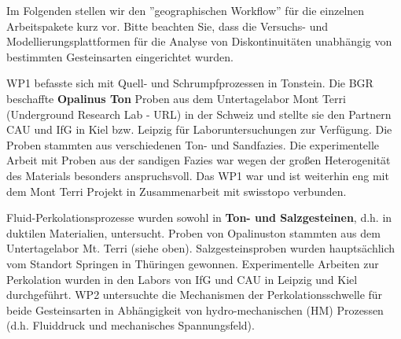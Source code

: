 Im Folgenden stellen wir den ''geographischen Workflow'' für die einzelnen Arbeitspakete kurz vor. Bitte beachten Sie, dass die Versuchs- und Modellierungsplattformen für die Analyse von Diskontinuitäten unabhängig von bestimmten Gesteinsarten eingerichtet wurden.

WP1 befasste sich mit Quell- und Schrumpfprozessen in Tonstein. Die BGR beschaffte \textbf{Opalinus Ton} Proben aus dem Untertagelabor Mont Terri (Underground Research Lab - URL) in der Schweiz und stellte sie den Partnern CAU und IfG in Kiel bzw. Leipzig für Laboruntersuchungen zur Verfügung. Die Proben stammten aus verschiedenen Ton- und Sandfazies. Die experimentelle Arbeit mit Proben aus der sandigen Fazies war wegen der gro{\ss}en Heterogenität des Materials besonders anspruchsvoll. Das WP1 war und ist weiterhin eng mit dem Mont Terri Projekt in Zusammenarbeit mit swisstopo verbunden.

Fluid-Perkolationsprozesse wurden sowohl in \textbf{Ton- und Salzgesteinen}, d.h. in duktilen Materialien, untersucht. Proben von Opalinuston stammten aus dem Untertagelabor Mt. Terri (siehe oben). Salzgesteinsproben wurden hauptsächlich vom Standort Springen in Thüringen gewonnen. Experimentelle Arbeiten zur Perkolation wurden in den Labors von IfG und CAU in Leipzig und Kiel durchgeführt. WP2 untersuchte die Mechanismen der Perkolationsschwelle für beide Gesteinsarten in Abhängigkeit von hydro-mechanischen (HM) Prozessen (d.h. Fluiddruck und mechanisches Spannungsfeld).

